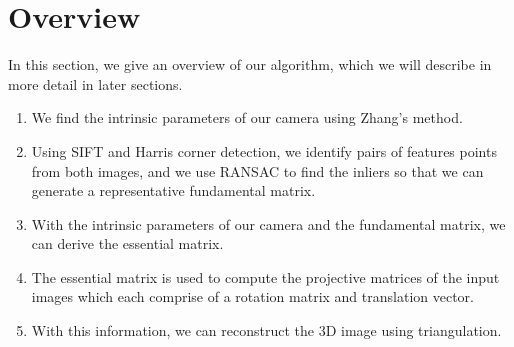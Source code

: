\section{Overview}
\label{s:overview}

In this section, we give an overview of our algorithm, which we will describe in more detail
in later sections.

\begin{enumerate}
\item{We find the intrinsic parameters of our camera using Zhang's method.}
\item{Using SIFT and Harris corner detection, we identify pairs of features points from both images, and we use RANSAC to find the inliers so that we can generate a representative fundamental matrix.}
\item{With the intrinsic parameters of our camera and the fundamental matrix, we can derive the essential matrix.}
\item{The essential matrix is used to compute the projective matrices of the input images which each comprise of a rotation matrix and translation vector. }
\item{With this information, we can reconstruct the 3D image using triangulation.}
\end{enumerate}
